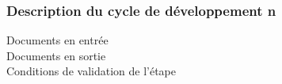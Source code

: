         \subsubsection{Description du cycle de développement n}



            \begin{description}
                \item[Documents en entrée]
                \item[Documents en sortie]
                \item[Conditions de validation de l'étape]
            \end{description}

\pagebreak
